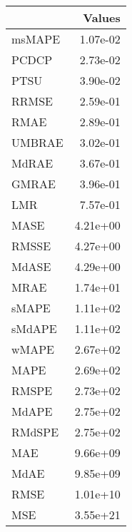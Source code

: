 \begin{tabular}{lr}
\toprule
 & Values \\
\midrule
msMAPE & 1.07e-02 \\
PCDCP & 2.73e-02 \\
PTSU & 3.90e-02 \\
RRMSE & 2.59e-01 \\
RMAE & 2.89e-01 \\
UMBRAE & 3.02e-01 \\
MdRAE & 3.67e-01 \\
GMRAE & 3.96e-01 \\
LMR & 7.57e-01 \\
MASE & 4.21e+00 \\
RMSSE & 4.27e+00 \\
MdASE & 4.29e+00 \\
MRAE & 1.74e+01 \\
sMAPE & 1.11e+02 \\
sMdAPE & 1.11e+02 \\
wMAPE & 2.67e+02 \\
MAPE & 2.69e+02 \\
RMSPE & 2.73e+02 \\
MdAPE & 2.75e+02 \\
RMdSPE & 2.75e+02 \\
MAE & 9.66e+09 \\
MdAE & 9.85e+09 \\
RMSE & 1.01e+10 \\
MSE & 3.55e+21 \\
\bottomrule
\end{tabular}
